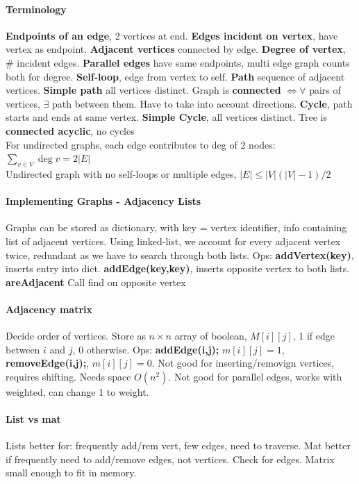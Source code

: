 \paragraph{Terminology} \textbf{Endpoints of an edge}, 2 vertices at end. \textbf{Edges incident on vertex}, have vertex as endpoint. \textbf{Adjacent vertices} connected by edge. \textbf{Degree of vertex}, \# incident edges. \textbf{Parallel edges} have same endpoints, multi edge graph counts both for degree. \textbf{Self-loop}, edge from vertex to self. \textbf{Path} sequence of adjacent vertices. \textbf{Simple path} all vertices distinct. Graph is \textbf{connected} $\iff \forall$ pairs of vertices, $\exists$ path between them. Have to take into account directions. \textbf{Cycle}, path starts and ends at same vertex. \textbf{Simple Cycle}, all vertices distinct. Tree is \textbf{connected acyclic}, no cycles
\\ For undirected graphs, each edge contributes to deg of 2 nodes: $\sum_{v\in V}\deg{v}=2|E|$
\\ Undirected graph with no self-loops or multiple edges, $|E|\leq |V|(|V|-1)/2$
\vspace{-7 pt}
\paragraph{Implementing Graphs - Adjacency Lists} Graphs can be stored as dictionary, with key = vertex identifier, info containing list of adjacent vertices. Using linked-list, we account for every adjacent vertex twice, redundant as we have to search through both lists. Ops: \textbf{addVertex(key)}, inserts entry into dict. \textbf{addEdge(key,key)}, inserts opposite vertex to both lists. \textbf{areAdjacent} Call find on opposite vertex
\vspace{-7 pt}
\paragraph{Adjacency matrix} Decide order of vertices. Store as $n \times n$ array of boolean, $M[i][j]$, 1 if edge between $i$ and $j$, 0 otherwise. Ops: \textbf{addEdge(i,j);} $m[i][j]=1$, \textbf{removeEdge(i,j);}, $m[i][j]=0$. Not good for inserting/removign vertices, requires shifting. Needs space $O(n^2)$. Not good for parallel edges, works with weighted, can change 1 to weight.
\vspace{-7 pt}
\paragraph{List vs mat}Lists better for: frequently add/rem vert, few edges, need to traverse. Mat better if frequently need to add/remove edges, not vertices. Check for edges. Matrix small enough to fit in memory.
